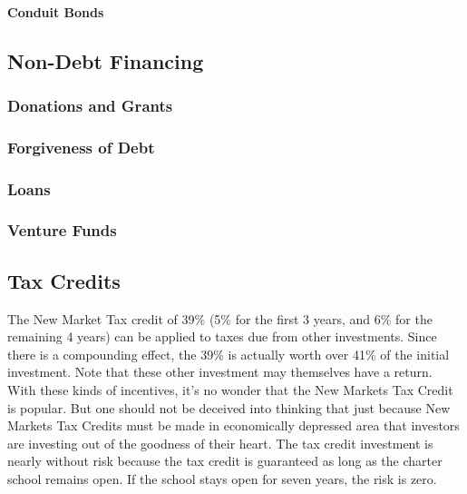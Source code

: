 \paragraph{Conduit Bonds}

\subsection{Non-Debt Financing}\indent%
\label{sec:non_debt_financing}

\subsubsection{Donations and Grants}\indent%
\label{sec:donations_grants}

\subsubsection{Forgiveness of Debt}\indent%
\label{sec:forgiveness_debt}

\subsubsection{Loans}\indent%
\label{sec:loans}

\subsubsection{Venture Funds}\indent%
\label{sec:venture_funds}

\subsection{Tax Credits}\indent%
\label{sec:tax-credit}

The New Market Tax credit of 39\% (5\% for the first 3 years, and 6\% for the remaining 4 years) can be applied to taxes due from other investments. Since there is a compounding effect, the 39\% is actually worth over 41\% of the initial investment. Note that these other investment may themselves have a return. With these kinds of incentives, it's no wonder that the New Markets Tax Credit is popular. But one should not be deceived into thinking that just because New Markets Tax Credits must be made in economically depressed area that investors are investing out of the goodness of their heart. The tax credit investment is nearly without risk because the tax credit is guaranteed as long as the charter school remains open. If the school stays open for seven years, the risk is zero.

